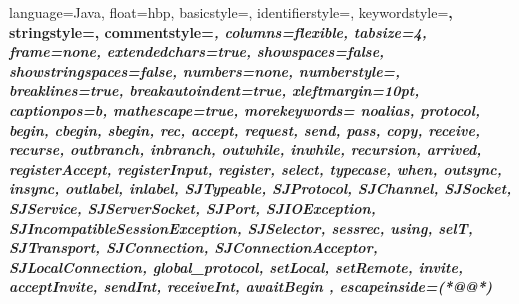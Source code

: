 \newcommand{\ARG}[1]{{\rm\em #1}}

\newcommand{\CODESIZE}{\small} %
\newcommand{\LISTINGSIZE}{\fontsize{8}{10}\selectfont} %
\newcommand{\CODE}[1]{\texttt{\CODESIZE #1}} %
\newcommand{\LST}[1]{\lstinline@#1@} %

\newcommand{\OPIN}[2]{\ensuremath{\CODE{#1}(#2)}} %
\newcommand{\OPOUT}[2]{\ensuremath{\CODE{#1}\langle #2 \rangle}} %
\newcommand{\PARTY}[1]{\ensuremath{\textbf{#1}}} %

\newcommand{\LISTINGSTYLE}{\ttfamily\LISTINGSIZE}

\lstset
{
	language=Java,
	float=hbp,
	basicstyle=\ttfamily\CODESIZE, %
	identifierstyle=\color{Black},
	keywordstyle=\bfseries\color{blue},
	stringstyle=\color{Violet},
	commentstyle=\itshape\color{RedViolet},
	columns=flexible,
	tabsize=4,
	frame=none,
	extendedchars=true,
	showspaces=false,
	showstringspaces=false,
	numbers=none,
	numberstyle=\tiny,
	breaklines=true,
	breakautoindent=true,
	xleftmargin=10pt,
	captionpos=b,
	mathescape=true,
	morekeywords=
	{	
		noalias,
		protocol, begin, cbegin, sbegin, rec,
		accept,
		request, send, pass, copy, receive, recurse, 
		outbranch, inbranch, outwhile, inwhile, recursion, 
		arrived, registerAccept, registerInput, register, select, 
		typecase, when, 
		outsync, insync, outlabel, inlabel, 
		SJTypeable, SJProtocol, SJChannel, SJSocket, SJService, SJServerSocket, SJPort, 
		SJIOException, SJIncompatibleSessionException, 
		SJSelector,  
		sessrec, 
		using,
                selT,
		SJTransport,  SJConnection,  SJConnectionAcceptor,  SJLocalConnection,
		global_protocol,
		setLocal, setRemote, invite, acceptInvite,
		sendInt, receiveInt,
		awaitBegin
	},
	escapeinside={(*@}{@*)}
}




